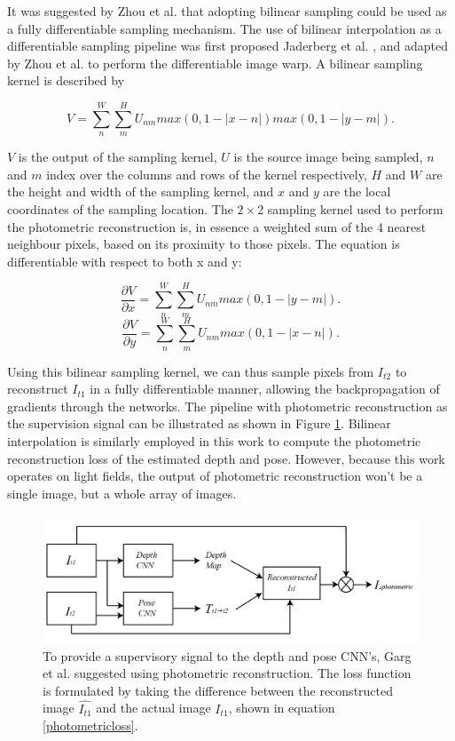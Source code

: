 It was suggested by Zhou et al. \cite{zhou2017unsupervised} that adopting bilinear sampling could be used as a fully differentiable sampling mechanism. The use of bilinear interpolation as a differentiable sampling pipeline was first proposed Jaderberg et al. \cite{jaderberg2015spatialtransformer}, and adapted by Zhou et al. \cite{zhou2017unsupervised} to perform the differentiable image warp. A bilinear sampling kernel is described by 

\begin{equation}
    V = \sum_n^W \sum_m^H U_{nm} max (0, 1-|x - n|) max(0, 1-|y - m|).
\end{equation}

$V$ is the output of the sampling kernel, $U$ is the source image being sampled, $n$ and $m$ index over the columns and rows of the kernel respectively, $H$ and $W$ are the height and width of the sampling kernel, and $x$ and $y$ are the local coordinates of the sampling location. The $2 \times 2$ sampling kernel used to perform the photometric reconstruction is, in essence a weighted sum of the 4 nearest neighbour pixels, based on its proximity to those pixels. The equation is differentiable with respect to both x and y:


\begin{equation}
    \frac{\partial{V}}{\partial{x}} = \sum_n^W \sum_m^H U_{nm} max(0, 1-|y - m|).
\end{equation}
\begin{equation}
    \frac{\partial{V}}{\partial{y}} = \sum_n^W \sum_m^H U_{nm} max(0, 1-|x - n|).
\end{equation}

Using this bilinear sampling kernel, we can thus sample pixels from $I_{t2}$ to reconstruct $I_{t1}$ in a fully differentiable manner, allowing the backpropagation of gradients through the networks. The pipeline with photometric reconstruction as the supervision signal can be illustrated as shown in Figure \ref{supervisedMLCNNS}. Bilinear interpolation is similarly employed in this work to compute the photometric reconstruction loss of the estimated depth and pose. However, because this work operates on light fields, the output of photometric reconstruction won't be a single image, but a whole array of images.


\begin{figure}
    \centering 
    \includegraphics[width=5in]{images/mlpipeline.png}
    \caption{To provide a supervisory signal to the depth and pose CNN's, Garg et al. \cite{garg2016unsupervised} suggested using photometric reconstruction. The loss function is formulated by taking the difference between the reconstructed image $\hat{I_{t1}}$ and the actual image $I_{t1}$, shown in equation \ref{photometricloss}.}
    \label{supervisedMLCNNS}
\end{figure}


